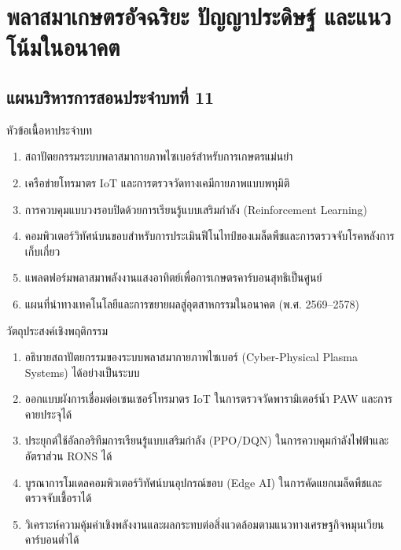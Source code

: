 \chapter{พลาสมาเกษตรอัจฉริยะ ปัญญาประดิษฐ์ และแนวโน้มในอนาคต}
\label{chap:ch11}


\vspace*{-6pt}
\section*{แผนบริหารการสอนประจำบทที่ 11}

\begin{planbox}{หัวข้อเนื้อหาประจำบท}
\begin{enumerate}
    \item สถาปัตยกรรมระบบพลาสมากายภาพไซเบอร์สำหรับการเกษตรแม่นยำ
    \item เครือข่ายโทรมาตร IoT และการตรวจวัดทางเคมีกายภาพแบบพหุมิติ
    \item การควบคุมแบบวงรอบปิดด้วยการเรียนรู้แบบเสริมกำลัง (Reinforcement Learning)
    \item คอมพิวเตอร์วิทัศน์บนขอบสำหรับการประเมินฟีโนไทป์ของเมล็ดพืชและการตรวจจับโรคหลังการเก็บเกี่ยว
    \item แพลตฟอร์มพลาสมาพลังงานแสงอาทิตย์เพื่อการเกษตรคาร์บอนสุทธิเป็นศูนย์
    \item แผนที่นำทางเทคโนโลยีและการขยายผลสู่อุตสาหกรรมในอนาคต (พ.ศ. 2569--2578)
\end{enumerate}
\end{planbox}

\begin{planbox}{วัตถุประสงค์เชิงพฤติกรรม}
\begin{enumerate}
    \item อธิบายสถาปัตยกรรมของระบบพลาสมากายภาพไซเบอร์ (Cyber-Physical Plasma Systems) ได้อย่างเป็นระบบ
    \item ออกแบบผังการเชื่อมต่อเซนเซอร์โทรมาตร IoT ในการตรวจวัดพารามิเตอร์น้ำ PAW และการคายประจุได้
    \item ประยุกต์ใช้อัลกอริทึมการเรียนรู้แบบเสริมกำลัง (PPO/DQN) ในการควบคุมกำลังไฟฟ้าและอัตราส่วน RONS ได้
    \item บูรณาการโมเดลคอมพิวเตอร์วิทัศน์บนอุปกรณ์ขอบ (Edge AI) ในการคัดแยกเมล็ดพืชและตรวจจับเชื้อราได้
    \item วิเคราะห์ความคุ้มค่าเชิงพลังงานและผลกระทบต่อสิ่งแวดล้อมตามแนวทางเศรษฐกิจหมุนเวียนคาร์บอนต่ำได้
\end{enumerate}
\end{planbox}

